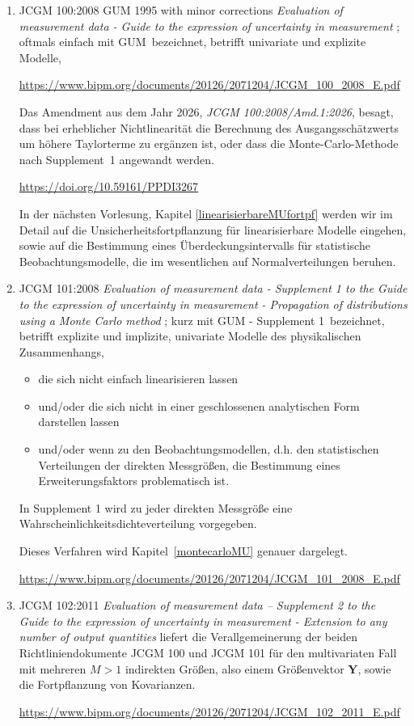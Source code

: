 \begin{enumerate}
\item JCGM 100:2008 GUM 1995 with minor corrections \textsl{Evaluation of measurement
data - Guide to the expression of uncertainty in measurement} \cite{GUM95}; oftmals einfach mit \glqq GUM\grqq ~bezeichnet,
betrifft univariate und explizite Modelle,

\url{https://www.bipm.org/documents/20126/2071204/JCGM_100_2008_E.pdf}

Das Amendment aus dem Jahr 2026, \textsl{JCGM 100:2008/Amd.1:2026}, besagt, dass bei erheblicher Nichtlinearität die Berechnung des Ausgangsschätzwerts um höhere Taylorterme zu ergänzen ist, oder dass die Monte-Carlo-Methode nach Supplement~1 angewandt werden.

\url{https://doi.org/10.59161/PPDI3267}

In der nächsten Vorlesung, Kapitel \ref{linearisierbareMUfortpf} werden wir im Detail auf die Unsicherheitsfortpflanzung für linearisierbare Modelle eingehen, sowie auf die Bestimmung eines Überdeckungsintervalls für statistische Beobachtungsmodelle, die im wesentlichen auf Normalverteilungen beruhen.

\item JCGM 101:2008 \textsl{Evaluation of measurement
data - Supplement 1 to the Guide to the expression of
uncertainty in measurement - Propagation of distributions using a Monte Carlo method} \cite{GUMS1};
kurz mit \glqq GUM - Supplement 1\grqq ~bezeichnet, betrifft
explizite und implizite, univariate Modelle des physikalischen Zusammenhangs,
  \begin{itemize}
  \item die sich nicht einfach linearisieren lassen
  \item und/oder die sich nicht in einer geschlossenen analytischen Form darstellen lassen
  \item und/oder wenn zu den Beobachtungsmodellen, d.h. den statistischen Verteilungen der direkten Messgrößen, die Bestimmung eines Erweiterungsfaktors problematisch ist.
  \end{itemize}

In Supplement 1 wird zu jeder direkten Messgröße eine Wahrscheinlichkeitsdichteverteilung vorgegeben.

Dieses Verfahren wird Kapitel~\ref{montecarloMU} genauer dargelegt.

\url{https://www.bipm.org/documents/20126/2071204/JCGM_101_2008_E.pdf}

\item JCGM 102:2011 \textsl{Evaluation of measurement data -- Supplement 2 to the Guide to the expression of uncertainty in measurement - Extension to any number of output quantities}
liefert die Verallgemeinerung der beiden Richtliniendokumente JCGM 100 und JCGM 101 für den multivariaten
Fall mit mehreren $M>1$ indirekten Größen, also einem Größenvektor $\mathbf{Y}$, sowie die Fortpflanzung von Kovarianzen.

\url{https://www.bipm.org/documents/20126/2071204/JCGM_102_2011_E.pdf}
\end{enumerate}

